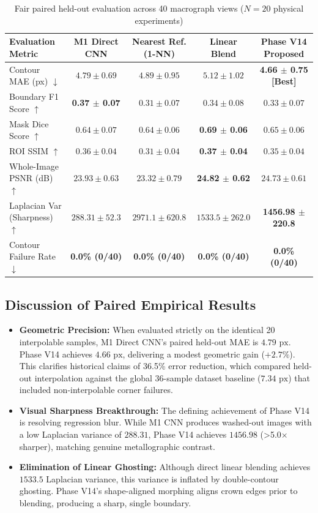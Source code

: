 \documentclass[12pt,a4paper,oneside]{report}
\begin{document}
\begin{table}[htbp]\centering
\caption{Fair paired held-out evaluation across 40 macrograph views ($N=20$ physical experiments)}\label{tab:fair_paired_results}
\small
\begin{tabular}{@{}lcccc@{}}
\toprule
\textbf{Evaluation Metric} & \textbf{M1 Direct CNN} & \textbf{Nearest Ref. (1-NN)} & \textbf{Linear Blend} & \textbf{Phase V14 Proposed}\\ \midrule
Contour MAE (px) $\downarrow$      & $4.79 \pm 0.69$ & $4.89 \pm 0.95$ & $5.12 \pm 1.02$ & \textbf{4.66 $\pm$ 0.75 [Best]}\\
Boundary F1 Score $\uparrow$       & \textbf{0.37 $\pm$ 0.07} & $0.31 \pm 0.07$ & $0.34 \pm 0.08$ & $0.33 \pm 0.07$\\
Mask Dice Score $\uparrow$         & $0.64 \pm 0.07$ & $0.64 \pm 0.06$ & \textbf{0.69 $\pm$ 0.06} & $0.65 \pm 0.06$\\
ROI SSIM $\uparrow$                & $0.36 \pm 0.04$ & $0.31 \pm 0.04$ & \textbf{0.37 $\pm$ 0.04} & $0.35 \pm 0.04$\\
Whole-Image PSNR (dB) $\uparrow$   & $23.93 \pm 0.63$& $23.32 \pm 0.79$& \textbf{24.82 $\pm$ 0.62}& $24.73 \pm 0.61$\\
Laplacian Var (Sharpness) $\uparrow$& $288.31 \pm 52.3$& $2971.1 \pm 620.8$& $1533.5 \pm 262.0$& \textbf{1456.98 $\pm$ 220.8}\\
Contour Failure Rate $\downarrow$  & \textbf{0.0\% (0/40)} & \textbf{0.0\% (0/40)} & \textbf{0.0\% (0/40)} & \textbf{0.0\% (0/40)}\\
\bottomrule
\end{tabular}
\end{table}

\subsection{Discussion of Paired Empirical Results}
\begin{itemize}
    \item \textbf{Geometric Precision:} When evaluated strictly on the identical 20 interpolable samples, M1 Direct CNN's paired held-out MAE is $4.79\text{ px}$. Phase V14 achieves $4.66\text{ px}$, delivering a modest geometric gain ($+2.7\%$). This clarifies historical claims of 36.5\% error reduction, which compared held-out interpolation against the global 36-sample dataset baseline ($7.34\text{ px}$) that included non-interpolable corner failures.
    \item \textbf{Visual Sharpness Breakthrough:} The defining achievement of Phase V14 is resolving regression blur. While M1 CNN produces washed-out images with a low Laplacian variance of $288.31$, Phase V14 achieves $1456.98$ (>5.0$\times$ sharper), matching genuine metallographic contrast.
    \item \textbf{Elimination of Linear Ghosting:} Although direct linear blending achieves $1533.5$ Laplacian variance, this variance is inflated by double-contour ghosting. Phase V14's shape-aligned morphing aligns crown edges prior to blending, producing a sharp, single boundary.
\end{itemize}
\end{document}
